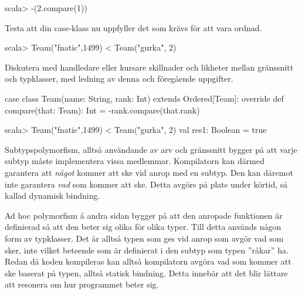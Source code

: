 \begin{REPLnonum}
scala> -(2.compare(1))
\end{REPLnonum}

\Subtask Testa att  din case-klass nu uppfyller det som krävs för att vara ordnad.
\begin{REPLnonum}
scala> Team("fnatic",1499) < Team("gurka", 2)
\end{REPLnonum}


\Subtask Diskutera med handledare eller kursare skillnader och likheter mellan gränssnitt och typklasser, med ledning av denna och föregående uppgifter.
\SOLUTION


\TaskSolved \what

\SubtaskSolved

\begin{Code}
case class Team(name: String, rank: Int) extends Ordered[Team]:
  override def compare(that: Team): Int = -rank.compare(that.rank)
\end{Code}

\SubtaskSolved

\begin{REPLnonum}
scala> Team("fnatic",1499) < Team("gurka", 2)
val res1: Boolean = true
\end{REPLnonum}

\SubtaskSolved
Subtypspolymorfism, alltså användande av arv och gränssnitt  bygger på att varje subtyp måste implementera vissa medlemmar. 
Kompilatorn kan därmed garantera att \emph{något} kommer att ske vid anrop med en subtyp.
Den kan däremot inte garantera \emph{vad} som kommer att ske. Detta avgörs på plats under körtid,
så kallad dynamisk bindning.

Ad hoc polymorfism å andra sidan bygger på att den anropade funktionen är definierad 
så att den beter sig olika för olika typer. Till detta används någon form av typklasser.
Det är alltså typen som ges vid anrop som avgör vad som sker, 
inte vilket beteende som är definierat i den subtyp som typen ''råkar'' ha.
Redan då koden kompileras kan alltså kompilatorn avgöra vad som kommer att ske baserat på
typen, alltså statisk bindning. Detta innebär att det blir lättare att resonera om
hur programmet beter sig.

\QUESTEND






